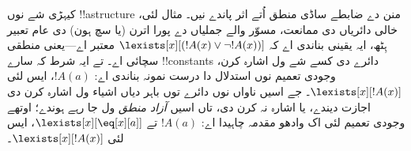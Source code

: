 \documentclass[../../../include/open-logic-section]{subfiles}
\begin{document}
\begin{digress}
کیہڑی شے نوں !!a{structure} منن دے ضابطے ساڈی منطق اُتے اثر
پاندے نیں۔ مثال لئی، خالی دائریاں دی ممانعت، مسوّر والے جملیاں
دے پورا اترن (یا سچ ہون) دی عام تعبیر ہِٹھ، ایہ یقینی بناندی اے
کہ $\lexists[x][(!A(x) \lor \lnot !A(x))]$ معتبر اے---یعنی
منطقی سچائی اے۔ تے ایہ شرط کہ سارے !!{constant}s دائرے دی
کسے شے ول اشارہ کرن، وجودی تعمیم نوں استدلال دا درست نمونہ
بناندی اے: $!A(a)$، ایس لئی $\lexists[x][!A(x)]$۔ جے اسیں
ناواں نوں دائرے توں باہر دیاں اشیاء ول اشارہ کرن دی اجازت
دیندے، یا اشارہ نہ کرن دی، تاں اسیں \emph{آزاد منطق} ول جا
رہے ہوندے؛ اوتھے وجودی تعمیم لئی اک وادھو مقدمہ چاہیدا اے:
$!A(a)$ تے $\lexists[x][\eq[x][a]]$، ایس لئی
$\lexists[x][!A(x)]$۔
\end{digress}
\end{document}
